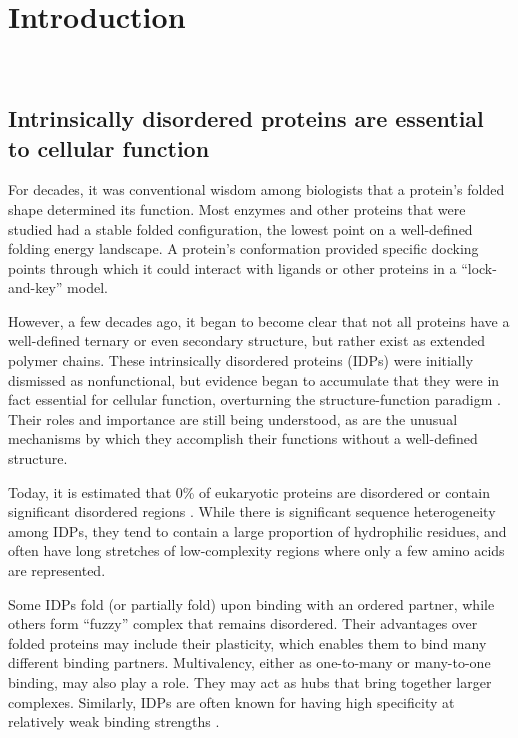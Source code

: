 \chapter{Introduction}~\label{ch01_introduction}


\section{Intrinsically disordered proteins are essential to cellular function}
For decades, it was conventional wisdom among biologists that a protein's folded shape determined its function.  Most enzymes and other proteins that were studied had a stable folded configuration, the lowest point on a well-defined folding energy landscape.  A protein's conformation provided specific docking points through which it could interact with ligands or other proteins in a ``lock-and-key'' model.

However, a few decades ago, it began to become clear that not all proteins have a well-defined ternary or even secondary structure, but rather exist as extended polymer chains.  These intrinsically disordered proteins (IDPs) were initially dismissed as nonfunctional, but evidence began to accumulate that they were in fact essential for cellular function, overturning the structure-function paradigm \cite{uversky13}.  Their roles and importance are still being understood, as are the unusual mechanisms by which they accomplish their functions without a well-defined structure.

Today, it is estimated that 0\% of eukaryotic proteins are disordered or contain significant disordered regions \cite{uversky13}.  While there is significant sequence heterogeneity among IDPs, they tend to contain a large proportion of hydrophilic residues, and often have long stretches of low-complexity regions where only a few amino acids are represented.

Some IDPs fold (or partially fold) upon binding with an ordered partner, while others form ``fuzzy'' complex that remains disordered.  Their advantages over folded proteins may include their plasticity, which enables them to bind many different binding partners.  Multivalency, either as one-to-many or many-to-one binding, may also play a role.  They may act as hubs that bring together larger complexes.  Similarly, IDPs are often known for having high specificity at relatively weak binding strengths \cite{uversky13}.

